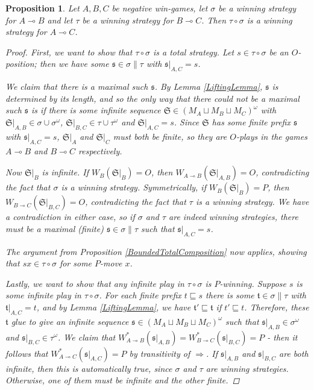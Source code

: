 \documentclass[11pt]{article} %
\theoremstyle{plain} %
\newtheorem{proposition}[theorem]{Proposition}
\theoremstyle{definition} %
\theoremstyle{note}
\theoremstyle{exercisestyle}
\renewcommand{\implies}{\multimap}
\newcommand{\comp}[2]{#1 \circ #2}
\newcommand{\cprd}{\sqcup}
\newcommand{\s}{\mathfrak s}
\renewcommand{\t}{\mathfrak t}
\newcommand{\prefix}{\sqsubseteq}
\renewcommand{\S}{{\mathfrak{S}}}
\begin{document}
\begin{proposition}
  Let $A,B,C$ be negative win-games, let $\sigma$ be a winning strategy for $A\implies B$ and let $\tau$ be a winning strategy for $B\implies C$.  Then $\comp\tau\sigma$ is a winning strategy for $A\implies C$.  
  \begin{proof}
    First, we want to show that $\comp\tau\sigma$ is a total strategy.  Let $s\in\comp\tau\sigma$ be an $O$-position; then we have some $\s\in\sigma\|\tau$ with $\s\vert_{A,C}=s$.  

    We claim that there is a maximal such $\s$.  By Lemma \ref{LiftingLemma}, $\s$ is determined by its length, and so the only way that there could not be a maximal such $\s$ is if there is some infinite sequence $\S\in(M_A\cprd M_B\cprd M_C)^\omega$ with $\S\vert_{A,B}\in\sigma\cup\sigma^\omega$, $\S\vert_{B,C}\in\tau\cup\tau^\omega$ and $\S\vert_{A,C}=s$.  Since $\S$ has some finite prefix $\s$ with $\s\vert_{A,C}=s$, $\S\vert_A$ and $\S\vert_C$ must both be finite, so they are $O$-plays in the games $A\implies B$ and $B\implies C$ respectively.  

    Now $\S\vert_B$ is infinite.  If $W_B(\S\vert_B)=O$, then $W_{A\implies B}(\S\vert_{A,B})=O$, contradicting the fact that $\sigma$ is a winning strategy.  Symmetrically, if $W_B(\S\vert_B)=P$, then $W_{B\implies C}(\S\vert_{B,C})=O$, contradicting the fact that $\tau$ is a winning strategy.  We have a contradiction in either case, so if $\sigma$ and $\tau$ are indeed winning strategies, there must be a maximal (finite) $\s\in\sigma\|\tau$ such that $\s\vert_{A,C}=s$.  

    The argument from Proposition \ref{BoundedTotalComposition} now applies, showing that $sx\in\comp\tau\sigma$ for some $P$-move $x$.  

    Lastly, we want to show that any infinite play in $\comp\tau\sigma$ is $P$-winning.  Suppose $s$ is some infinite play in $\comp\tau\sigma$.  For each finite prefix $t\prefix s$ there is some $\t\in\sigma\|\tau$ with $\t\vert_{A,C}=t$, and by Lemma \ref{LiftingLemma}, we have $\t'\prefix\t$ if $t'\prefix t$.  Therefore, these $\t$ glue to give an infinite sequence $\s\in(M_A\cprd M_B\cprd M_C)^\omega$ such that $\s\vert_{A,B}\in\sigma^\omega$ and $\s\vert_{B,C}\in\tau^\omega$.  We claim that $W_{A\implies B}^*(\s\vert_{A,B})=W_{B\implies C}^*(\s\vert_{B,C})=P$ - then it follows that $W_{A\implies C}^*(\s\vert_{A,C})=P$ by transitivity of $\Rightarrow$.  If $\s\vert_{A,B}$ and $\s\vert_{B,C}$ are both infinite, then this is automatically true, since $\sigma$ and $\tau$ are winning strategies.  Otherwise, one of them must be infinite and the other finite.  


\end{proof}
\end{proposition}
\end{document}
